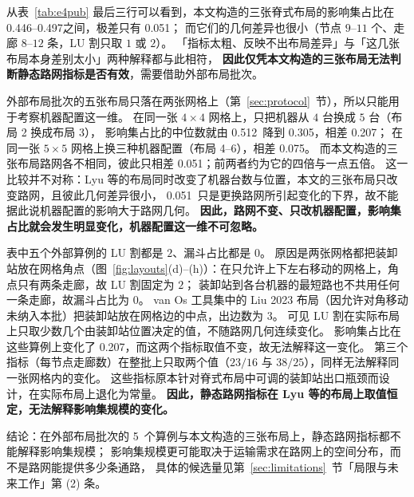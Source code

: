 \documentclass[manuscript,screen,review]{acmart}
\newcommand{\NPubInst}{5}
\newcommand{\PubCloLo}{0.305}
\newcommand{\PubCloHi}{0.512}
\newcommand{\PubCloSpread}{0.207}
\newcommand{\PubCloSpreadBig}{0.075}
\newcommand{\SelfCloLo}{0.446}
\newcommand{\SelfCloHi}{0.497}
\newcommand{\SelfCloSpread}{0.051}
\begin{document}
从表~\ref{tab:e4pub} 最后三行可以看到，本文构造的三张脊式布局的影响集占比在 \SelfCloLo--\SelfCloHi 之间，极差只有 \SelfCloSpread；
而它们的几何差异也很小（节点 \(9\)--\(11\) 个、走廊 \(8\)--\(12\) 条，LU 割只取 \(1\) 或 \(2\)）。
「指标太粗、反映不出布局差异」与「这几张布局本身差别太小」两种解释都与此相符，
\textbf{因此仅凭本文构造的三张布局无法判断静态路网指标是否有效}，需要借助外部布局批次。

外部布局批次的五张布局只落在两张网格上（第~\ref{sec:protocol}~节），所以只能用于考察机器配置这一维。
在同一张 \(4\times 4\) 网格上，只把机器从 \(4\) 台换成 \(5\) 台（布局 2 换成布局 3），
影响集占比的中位数就由 \PubCloHi\ 降到 \PubCloLo，相差 \PubCloSpread；
在同一张 \(5\times 5\) 网格上换三种机器配置（布局 4--6），相差 \PubCloSpreadBig。
而本文构造的三张布局路网各不相同，彼此只相差 \SelfCloSpread；前两者约为它的四倍与一点五倍。
这一比较并不对称：Lyu 等的布局同时改变了机器台数与位置，本文的三张布局只改变路网，且彼此几何差异很小，
\SelfCloSpread\ 只是更换路网所引起变化的下界，故不能据此说机器配置的影响大于路网几何。
\textbf{因此，路网不变、只改机器配置，影响集占比就会发生明显变化，机器配置这一维不可忽略。}

表中五个外部算例的 LU 割都是 \(2\)、漏斗占比都是 \(0\)。
原因是两张网格都把装卸站放在网格角点（图~\ref{fig:layouts}(d)--(h)）：在只允许上下左右移动的网格上，角点只有两条走廊，故 LU 割固定为 \(2\)；
装卸站到各台机器的最短路也不共用任何一条走廊，故漏斗占比为 \(0\)。
van Os 工具集中的 Liu 2023 布局（因允许对角移动未纳入本批）把装卸站放在网格边的中点，出边数为 \(3\)。
可见 LU 割在实际布局上只取少数几个由装卸站位置决定的值，不随路网几何连续变化。
影响集占比在这些算例上变化了 \PubCloSpread，而这两个指标取值不变，故无法解释这一变化。
第三个指标（每节点走廊数）在整批上只取两个值（\(23/16\) 与 \(38/25\)），同样无法解释同一张网格内的变化。
这些指标原本针对脊式布局中可调的装卸站出口瓶颈而设计，在实际布局上退化为常量。
\textbf{因此，静态路网指标在 Lyu 等的布局上取值恒定，无法解释影响集规模的变化。}

结论：在外部布局批次的 \NPubInst\ 个算例与本文构造的三张布局上，静态路网指标都不能解释影响集规模；
影响集规模更可能取决于运输需求在路网上的空间分布，而不是路网能提供多少条通路，
具体的候选量见第~\ref{sec:limitations}~节「局限与未来工作」第 (2) 条。
\end{document}
